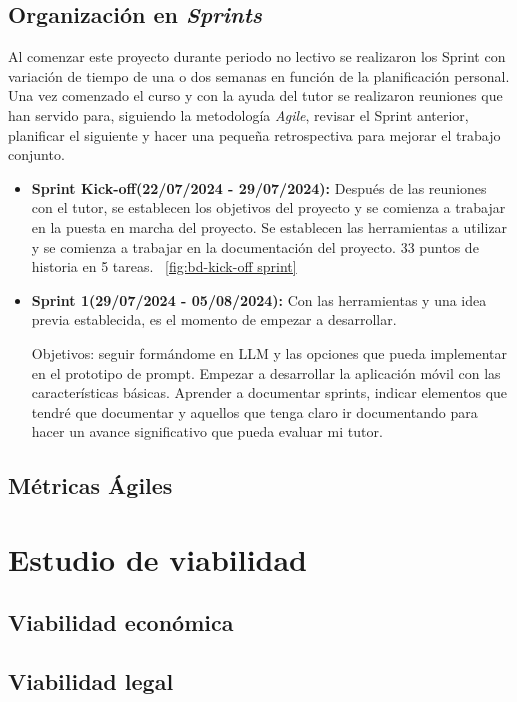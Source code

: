 \subsection{Organización en \textit{Sprints}}

Al comenzar este proyecto durante periodo no lectivo se realizaron los Sprint con variación de tiempo de una o dos semanas en función de la planificación personal. Una vez comenzado el curso y con la ayuda del tutor se realizaron reuniones que han servido para, siguiendo la metodología \textit{Agile}, revisar el Sprint anterior, planificar el siguiente y hacer una pequeña retrospectiva para mejorar el trabajo conjunto.


\begin{itemize}
    \item \textbf{Sprint Kick-off(22/07/2024 - 29/07/2024):} Después de las reuniones con el tutor, se establecen los objetivos del proyecto y se comienza a trabajar en la puesta en marcha del proyecto. Se establecen las herramientas a utilizar y se comienza a trabajar en la documentación del proyecto. 33 puntos de historia en 5 tareas.
    ~\ref{fig:bd-kick-off sprint}
    

    \item \textbf{Sprint 1(29/07/2024 - 05/08/2024):} Con las herramientas y una idea previa establecida, es el momento de empezar a desarrollar.

    Objetivos: seguir formándome en LLM y las opciones que pueda implementar en el prototipo de prompt.
    Empezar a desarrollar la aplicación móvil con las características básicas.
    Aprender a documentar sprints, indicar elementos que tendré que documentar y aquellos que tenga claro ir documentando para hacer un avance significativo que pueda evaluar mi tutor.
\end{itemize}

\subsection{Métricas Ágiles}

\section{Estudio de viabilidad}

\subsection{Viabilidad económica}

\subsection{Viabilidad legal}


